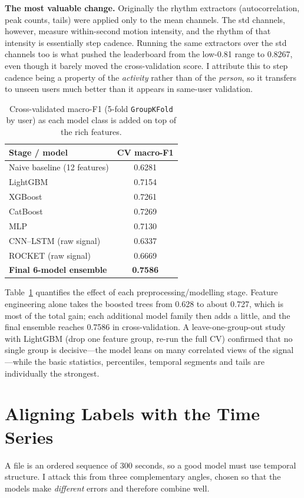 \documentclass[conference]{IEEEtran}
\begin{document}
\textbf{The most valuable change.} Originally the rhythm extractors
(autocorrelation, peak counts, tails) were applied only to the mean channels. The
std channels, however, measure within-second motion intensity, and the rhythm of
that intensity is essentially step cadence. Running the same extractors over the std
channels too is what pushed the leaderboard from the low-0.81 range to 0.8267, even
though it barely moved the cross-validation score. I attribute this to step cadence
being a property of the \emph{activity} rather than of the \emph{person}, so it
transfers to unseen users much better than it appears in same-user validation.

\begin{table}[t]
\caption{Cross-validated macro-F1 (5-fold \texttt{GroupKFold} by user) as each
model class is added on top of the rich features.}
\label{tab:stages}
\centering
\begin{tabular}{lc}
\toprule
Stage / model & CV macro-F1 \\
\midrule
Naive baseline (12 features) & 0.6281 \\
LightGBM~\cite{ke2017lightgbm} & 0.7154 \\
XGBoost~\cite{chen2016xgboost} & 0.7261 \\
CatBoost~\cite{prokhorenkova2018catboost} & 0.7269 \\
MLP & 0.7130 \\
CNN--LSTM (raw signal) & 0.6337 \\
ROCKET (raw signal)~\cite{dempster2020rocket} & 0.6669 \\
\textbf{Final 6-model ensemble} & \textbf{0.7586} \\
\bottomrule
\end{tabular}
\end{table}

Table~\ref{tab:stages} quantifies the effect of each preprocessing/modelling stage.
Feature engineering alone takes the boosted trees from 0.628 to about 0.727, which
is most of the total gain; each additional model family then adds a little, and the
final ensemble reaches 0.7586 in cross-validation. A leave-one-group-out study with
LightGBM (drop one feature group, re-run the full CV) confirmed that no single group
is decisive---the model leans on many correlated views of the signal---while the
basic statistics, percentiles, temporal segments and tails are individually the
strongest.

\section{Aligning Labels with the Time Series}
A file is an ordered sequence of 300 seconds, so a good model must use temporal
structure. I attack this from three complementary angles, chosen so that the models
make \emph{different} errors and therefore combine well.
\end{document}
